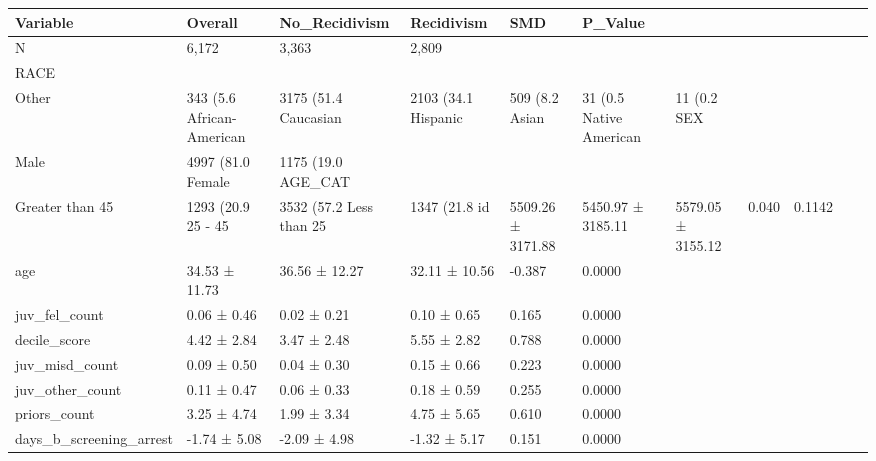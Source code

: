 \begin{tabular}{llllll}
\toprule
Variable & Overall & No_Recidivism & Recidivism & SMD & P_Value \\
\midrule
N & 6,172 & 3,363 & 2,809 &  &  \\
RACE &  &  &  &  &  \\
  Other & 343 (5.6%
  African-American & 3175 (51.4%
  Caucasian & 2103 (34.1%
  Hispanic & 509 (8.2%
  Asian & 31 (0.5%
  Native American & 11 (0.2%
SEX &  &  &  &  &  \\
  Male & 4997 (81.0%
  Female & 1175 (19.0%
AGE_CAT &  &  &  &  &  \\
  Greater than 45 & 1293 (20.9%
  25 - 45 & 3532 (57.2%
  Less than 25 & 1347 (21.8%
id & 5509.26 ± 3171.88 & 5450.97 ± 3185.11 & 5579.05 ± 3155.12 & 0.040 & 0.1142 \\
age & 34.53 ± 11.73 & 36.56 ± 12.27 & 32.11 ± 10.56 & -0.387 & 0.0000 \\
juv_fel_count & 0.06 ± 0.46 & 0.02 ± 0.21 & 0.10 ± 0.65 & 0.165 & 0.0000 \\
decile_score & 4.42 ± 2.84 & 3.47 ± 2.48 & 5.55 ± 2.82 & 0.788 & 0.0000 \\
juv_misd_count & 0.09 ± 0.50 & 0.04 ± 0.30 & 0.15 ± 0.66 & 0.223 & 0.0000 \\
juv_other_count & 0.11 ± 0.47 & 0.06 ± 0.33 & 0.18 ± 0.59 & 0.255 & 0.0000 \\
priors_count & 3.25 ± 4.74 & 1.99 ± 3.34 & 4.75 ± 5.65 & 0.610 & 0.0000 \\
days_b_screening_arrest & -1.74 ± 5.08 & -2.09 ± 4.98 & -1.32 ± 5.17 & 0.151 & 0.0000 \\

\end{tabular}
